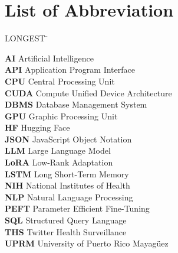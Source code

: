 

\chapter*{List of Abbreviation}

 \noindent
\vspace{-1.75\baselineskip}
  \begin{tabbing}
LONGEST \=  \kill %

\textbf{AI} \> Artificial Intelligence\\
\textbf{API} \> Application Program Interface\\
\textbf{CPU} \> Central Processing Unit\\
\textbf{CUDA} \> Compute Unified Device Architecture\\
\textbf{DBMS} \> Database Management System\\
\textbf{GPU} \> Graphic Processing Unit\\
\textbf{HF} \> Hugging Face\\
\textbf{JSON} \> JavaScript Object Notation\\
\textbf{LLM} \> Large Language Model\\
\textbf{LoRA} \> Low-Rank Adaptation\\
\textbf{LSTM} \> Long Short-Term Memory\\
\textbf{NIH} \> National Institutes of Health\\
\textbf{NLP} \> Natural Language Processing\\
\textbf{PEFT} \> Parameter Efficient Fine-Tuning\\
\textbf{SQL} \> Structured Query Language\\
\textbf{THS} \> Twitter Health Surveillance\\
\textbf{UPRM} \> University of Puerto Rico Mayag\"uez\\


\end{tabbing}